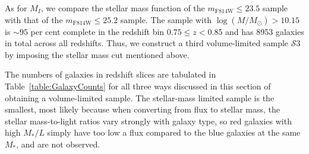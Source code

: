\documentclass[twocolumn,useAMS,usenatbib]{mn2e}
\newcommand{\rachel}[1]{{\textcolor{red}{#1}}}
\newcommand{\claire}[1]{{\textcolor{magenta}{#1}}}
\newcommand{\s}{\ensuremath{\mathcal{S}}}
\begin{document}
As for $M_I$, we compare the stellar mass function of the $m_\text{F814W}\le23.5$ sample with that of the $m_\text{F814W}\le25.2$ sample. 
The sample with $\log(M/M_\odot) > 10.15$ is $\sim 95$ per cent
complete in the redshift bin $0.75 \le z< 0.85$ and has 8953
galaxies in total across all redshifts.
Thus, we construct a third volume-limited sample \s$3$ by imposing the
stellar mass cut mentioned above. 

The numbers of galaxies in redshift slices
are tabulated in Table~\ref{table:GalaxyCounts} for all three ways
discussed in this section of obtaining a volume-limited sample. The
stellar-mass limited sample is the smallest, most likely because when
converting from flux to stellar mass, the stellar mass-to-light ratios
vary strongly with galaxy type, so red galaxies with high $M_*/L$
simply have too low a flux compared to the blue galaxies at the same
$M_*$, and are not observed.
\end{document}
